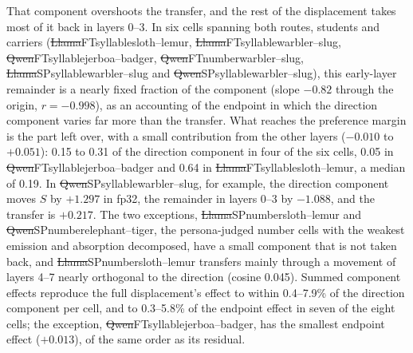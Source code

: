 That component overshoots the transfer, and the rest of the displacement takes most of it back in layers 0--3. In six cells spanning both routes, students and carriers (\st{Llama}{FT}{syllable}{sloth--lemur}, \st{Llama}{FT}{syllable}{warbler--slug}, \st{Qwen}{FT}{syllable}{jerboa--badger}, \st{Qwen}{FT}{number}{warbler--slug}, \st{Llama}{SP}{syllable}{warbler--slug} and \st{Qwen}{SP}{syllable}{warbler--slug}), this early-layer remainder is a nearly fixed fraction of the component (slope $-0.82$ through the origin, $r = -0.998$), as an accounting of the endpoint in which the direction component varies far more than the transfer. What reaches the preference margin is the part left over, with a small contribution from the other layers ($-0.010$ to $+0.051$): 0.15 to 0.31 of the direction component in four of the six cells, 0.05 in \st{Qwen}{FT}{syllable}{jerboa--badger} and 0.64 in \st{Llama}{FT}{syllable}{sloth--lemur}, a median of 0.19. In \st{Qwen}{SP}{syllable}{warbler--slug}, for example, the direction component moves $S$ by $+1.297$ in fp32, the remainder in layers 0--3 by $-1.088$, and the transfer is $+0.217$. The two exceptions, \st{Llama}{SP}{number}{sloth--lemur} and \st{Qwen}{SP}{number}{elephant--tiger}, the persona-judged number cells with the weakest emission and absorption decomposed, have a small component that is not taken back, and \st{Llama}{SP}{number}{sloth--lemur} transfers mainly through a movement of layers 4--7 nearly orthogonal to the direction (cosine 0.045). Summed component effects reproduce the full displacement's effect to within 0.4--7.9\% of the direction component per cell, and to 0.3--5.8\% of the endpoint effect in seven of the eight cells; the exception, \st{Qwen}{FT}{syllable}{jerboa--badger}, has the smallest endpoint effect ($+0.013$), of the same order as its residual.

